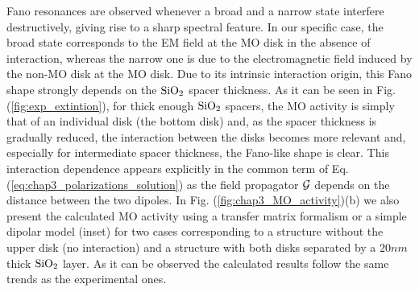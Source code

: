 Fano resonances are observed whenever a broad and a narrow state interfere destructively, giving rise to a sharp spectral feature. In our specific case, the broad state corresponds to the EM field at the MO disk in the absence of interaction, whereas the narrow one is due to the electromagnetic field induced by the non-MO disk at the MO disk. Due to its intrinsic interaction origin, this Fano shape strongly depends on the $\textnormal{SiO}_2$ spacer thickness. As it can be seen in Fig. (\ref{fig:exp_extintion}), for thick enough $\textnormal{SiO}_2$ spacers, the MO activity is simply that of an individual disk (the bottom disk) and, as the spacer thickness is gradually reduced, the interaction between the disks becomes more relevant and, especially for intermediate spacer thickness, the Fano-like shape is clear. This interaction dependence appears explicitly in the common term of Eq. (\ref{eq:chap3_polarizations_solution}) as the field propagator ${\cal{G}}$ depends on the distance between the two dipoles. In Fig. (\ref{fig:chap3_MO_activity})(b) we also present the calculated MO activity using a transfer matrix formalism or a simple dipolar model (inset) for two cases corresponding to a structure without the upper disk (no interaction) and a structure with both disks separated by a $20 nm$ thick $\textnormal{SiO}_2$ layer. As it can be observed the calculated results follow the same trends as the experimental ones.


